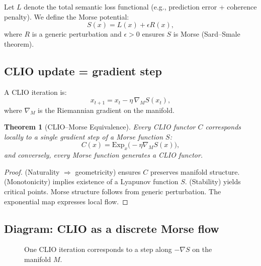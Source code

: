 \documentclass[11pt,a4paper,twocolumn]{article}
\newtheorem{theorem}{Theorem}[section]
\begin{document}
Let $L$ denote the total semantic loss functional (e.g., prediction
error + coherence penalty).  
We define the Morse potential:
\[
S(x) = L(x) + \epsilon R(x),
\]
where $R$ is a generic perturbation and $\epsilon > 0$ ensures $S$ is
Morse (Sard–Smale theorem).

\subsection{CLIO update = gradient step}

A CLIO iteration is:
\[
x_{t+1} = x_t - \eta \,\nabla_M S(x_t),
\]
where $\nabla_M$ is the Riemannian gradient on the manifold.

\begin{theorem}[CLIO–Morse Equivalence]
Every CLIO functor $C$ corresponds locally to a single gradient step
of a Morse function $S$:
\[
C(x) = \mathrm{Exp}_x \big(-\eta \nabla_M S(x)\big),
\]
and conversely, every Morse function generates a CLIO functor.
\end{theorem}

\begin{proof}
(Naturality $\Rightarrow$ geometricity) ensures $C$ preserves manifold structure.  
(Monotonicity) implies existence of a Lyapunov function $S$.  
(Stability) yields critical points.  
Morse structure follows from generic perturbation.  
The exponential map expresses local flow.
\end{proof}

\subsection{Diagram: CLIO as a discrete Morse flow}

\begin{figure}[H]
\centering
{}
\caption{One CLIO iteration corresponds to a step along $-\nabla S$ on the manifold $M$.}
\end{figure}
\end{document}
